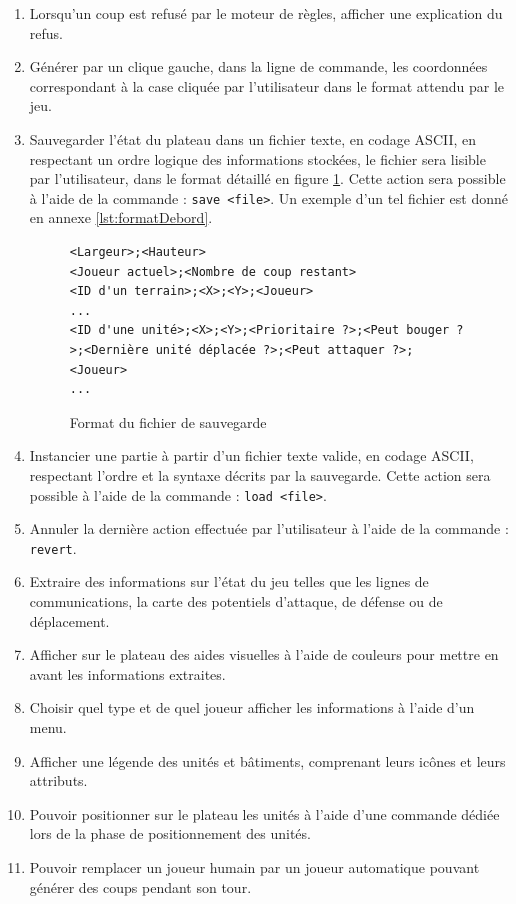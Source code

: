 \documentclass[a4paper]{report}
\begin{document}
\begin{enumerate}
\item Lorsqu'un coup est refusé par le moteur de règles, afficher une explication du refus.

\item Générer par un clique gauche, dans la ligne de commande, les coordonnées correspondant à la case cliquée par l'utilisateur dans le format attendu par le jeu.

\item Sauvegarder l'état du plateau dans un fichier texte, en codage ASCII, en respectant un ordre logique des informations stockées, le fichier sera lisible par l'utilisateur, dans le format détaillé en figure \ref{fig:savefile}. Cette action sera possible à l'aide de la commande : \texttt{save <file>}. Un exemple d'un tel fichier est donné en annexe \ref{lst:formatDebord}.

\begin{figure}[!h]
\caption{Format du fichier de sauvegarde}
\label{fig:savefile}
\centering
\begin{lstlisting}[basicstyle=\scriptsize\tt, columns=fullflexible]
<Largeur>;<Hauteur>
<Joueur actuel>;<Nombre de coup restant>
<ID d'un terrain>;<X>;<Y>;<Joueur>
...
<ID d'une unité>;<X>;<Y>;<Prioritaire ?>;<Peut bouger ?>;<Dernière unité déplacée ?>;<Peut attaquer ?>;<Joueur>
...
\end{lstlisting}
\end{figure}

\item Instancier une partie à partir d'un fichier texte valide, en codage ASCII, respectant l'ordre et la syntaxe décrits par la sauvegarde. Cette action sera possible à l'aide de la commande : \texttt{load <file>}.

\item Annuler la dernière action effectuée par l'utilisateur à l'aide de la commande : \texttt{revert}.

\item Extraire des informations sur l'état du jeu telles que les lignes de communications, la carte des potentiels d'attaque, de défense ou de déplacement.

\item Afficher sur le plateau des aides visuelles à l'aide de couleurs pour mettre en avant les informations extraites.

\item Choisir quel type et de quel joueur afficher les informations à l'aide d'un menu.

\item Afficher une légende des unités et bâtiments, comprenant leurs icônes et leurs attributs.

\item Pouvoir positionner sur le plateau les unités à l'aide d'une commande dédiée lors de la phase de positionnement des unités.

\item Pouvoir remplacer un joueur humain par un joueur automatique pouvant générer des coups pendant son tour.

\end{enumerate}
\end{document}
